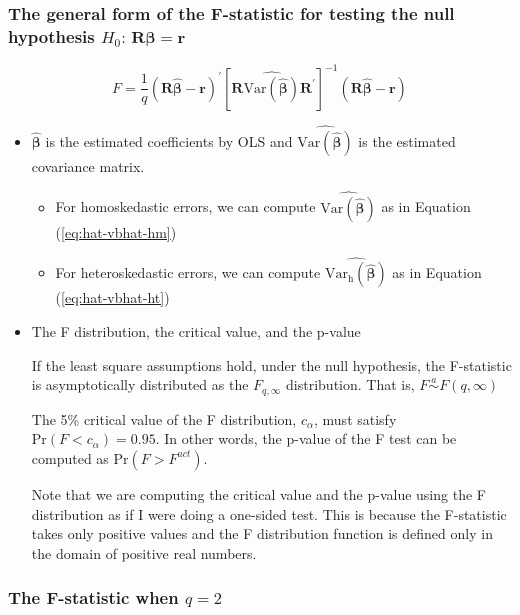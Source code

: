 \documentclass[a4paper,11pt]{article}
\newcommand{\var}{\mathrm{Var}}
\newcommand{\pr}{\mathrm{Pr}}
\begin{document}
\subsubsection*{The general form of the F-statistic for testing the null hypothesis \(H_0:\, \mathbf{R}\boldsymbol{\beta} = \mathbf{r}\)}
\label{sec:org64a4a15}

\begin{equation}
\label{eq:ftest-gen}
F = \frac{1}{q}(\mathbf{R}\hat{\boldsymbol{\beta}} - \mathbf{r})^{\prime} \left[ \mathbf{R} \widehat{\var(\hat{\boldsymbol{\beta}})} \mathbf{R}^{\prime} \right]^{-1} (\mathbf{R}\hat{\boldsymbol{\beta}} - \mathbf{r})
\end{equation}
\begin{itemize}
\item \(\hat{\boldsymbol{\beta}}\) is the estimated coefficients by OLS and
\(\widehat{\var(\hat{\boldsymbol{\beta}})}\) is the estimated covariance
matrix.
\begin{itemize}
\item For homoskedastic errors, we can compute
\(\widehat{\var(\hat{\boldsymbol{\beta}})}\) as in Equation (\ref{eq:hat-vbhat-hm})
\item For heteroskedastic errors, we can compute
\(\widehat{\var_{\mathrm{h}}(\hat{\boldsymbol{\beta}})}\) as in
Equation (\ref{eq:hat-vbhat-ht})
\end{itemize}
\end{itemize}

\begin{itemize}
\item The F distribution, the critical value, and the p-value
\label{sec:org557b41e}

If the least square assumptions hold, under the null hypothesis, the
F-statistic is asymptotically distributed as the \(F_{q, \infty}\)
distribution. That is, \(F \overset{a}{\sim} F(q, \infty)\)

The 5\% critical value of the F distribution, \(c_{\alpha}\), must
satisfy \(\pr(F < c_{\alpha}) = 0.95\). In other words, the p-value of
the F test can be computed as \(\pr(F > F^{act})\).

Note that we are computing the
critical value and the p-value using the F distribution as if I were
doing a one-sided test. This is because the F-statistic takes only
positive values and the F distribution function is defined only in the
domain of positive real numbers.
\end{itemize}

\subsubsection*{The F-statistic when \(q=2\)}
\label{sec:org8949ca5}
\end{document}
